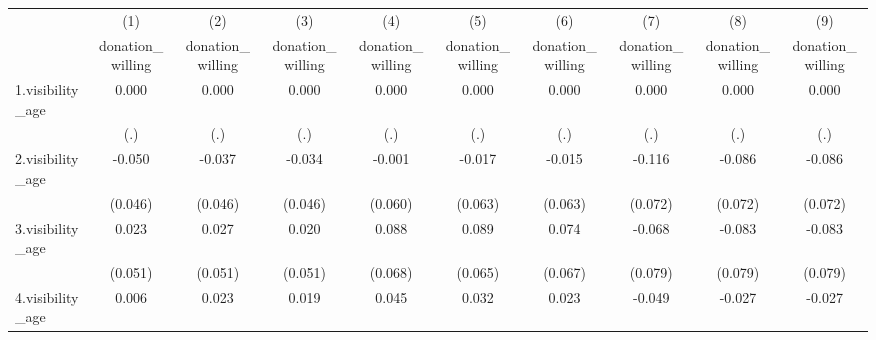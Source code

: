 {
\def\sym#1{\ifmmode^{#1}\else\(^{#1}\)\fi}
\begin{tabular}{l*{9}{c}}
\hline\hline
            &\multicolumn{1}{c}{(1)}&\multicolumn{1}{c}{(2)}&\multicolumn{1}{c}{(3)}&\multicolumn{1}{c}{(4)}&\multicolumn{1}{c}{(5)}&\multicolumn{1}{c}{(6)}&\multicolumn{1}{c}{(7)}&\multicolumn{1}{c}{(8)}&\multicolumn{1}{c}{(9)}\\
            &\multicolumn{1}{c}{donation\_willing}&\multicolumn{1}{c}{donation\_willing}&\multicolumn{1}{c}{donation\_willing}&\multicolumn{1}{c}{donation\_willing}&\multicolumn{1}{c}{donation\_willing}&\multicolumn{1}{c}{donation\_willing}&\multicolumn{1}{c}{donation\_willing}&\multicolumn{1}{c}{donation\_willing}&\multicolumn{1}{c}{donation\_willing}\\
\hline
1.visibility\_age&       0.000         &       0.000         &       0.000         &       0.000         &       0.000         &       0.000         &       0.000         &       0.000         &       0.000         \\
            &         (.)         &         (.)         &         (.)         &         (.)         &         (.)         &         (.)         &         (.)         &         (.)         &         (.)         \\
[1em]
2.visibility\_age&      -0.050         &      -0.037         &      -0.034         &      -0.001         &      -0.017         &      -0.015         &      -0.116         &      -0.086         &      -0.086         \\
            &     (0.046)         &     (0.046)         &     (0.046)         &     (0.060)         &     (0.063)         &     (0.063)         &     (0.072)         &     (0.072)         &     (0.072)         \\
[1em]
3.visibility\_age&       0.023         &       0.027         &       0.020         &       0.088         &       0.089         &       0.074         &      -0.068         &      -0.083         &      -0.083         \\
            &     (0.051)         &     (0.051)         &     (0.051)         &     (0.068)         &     (0.065)         &     (0.067)         &     (0.079)         &     (0.079)         &     (0.079)         \\
[1em]
4.visibility\_age&       0.006         &       0.023         &       0.019         &       0.045         &       0.032         &       0.023         &      -0.049         &      -0.027         &      -0.027         \\

\end{tabular}}
